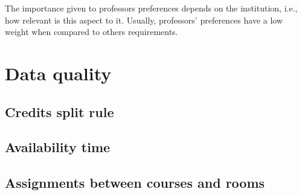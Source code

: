 The importance given to professors preferences depends on the institution, i.e., how relevant is this aspect to it. Usually, professors' preferences have a low weight when compared to others requirements.



\section{Data quality}

\subsection{Credits split rule}

\subsection{Availability time}


\subsection{Assignments between courses and rooms}




